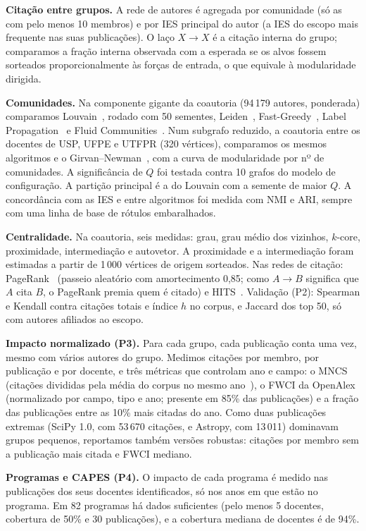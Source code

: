 \documentclass[12pt]{projeto}
\begin{document}
\textbf{Citação entre grupos.} A rede de autores é agregada por comunidade (só as com pelo menos 10 membros) e por IES principal do autor (a IES do escopo mais frequente nas suas publicações). O laço $X \to X$ é a citação interna do grupo; comparamos a fração interna observada com a esperada se os alvos fossem sorteados proporcionalmente às forças de entrada, o que equivale à modularidade dirigida.

\textbf{Comunidades.} Na componente gigante da coautoria (94\,179 autores, ponderada) comparamos Louvain~\cite{blondel2008}, rodado com 50 sementes, Leiden~\cite{traag2019}, Fast-Greedy~\cite{clauset2004}, Label Propagation~\cite{raghavan2007} e Fluid Communities~\cite{pares2017}. Num subgrafo reduzido, a coautoria entre os docentes de USP, UFPE e UTFPR (320 vértices), comparamos os mesmos algoritmos e o Girvan--Newman~\cite{girvan2002}, com a curva de modularidade por nº de comunidades. A significância de $Q$ foi testada contra 10 grafos do modelo de configuração. A partição principal é a do Louvain com a semente de maior $Q$. A concordância com as IES e entre algoritmos foi medida com NMI e ARI, sempre com uma linha de base de rótulos embaralhados.

\textbf{Centralidade.} Na coautoria, seis medidas: grau, grau médio dos vizinhos, $k$-core, proximidade, intermediação e autovetor. A proximidade e a intermediação foram estimadas a partir de 1\,000 vértices de origem sorteados. Nas redes de citação: PageRank~\cite{brin1998} (passeio aleatório com amortecimento 0,85; como $A \to B$ significa que $A$ cita $B$, o PageRank premia quem é citado) e HITS~\cite{kleinberg1999}. Validação (P2): Spearman e Kendall contra citações totais e índice $h$ no corpus, e Jaccard dos top 50, só com autores afiliados ao escopo.

\textbf{Impacto normalizado (P3).} Para cada grupo, cada publicação conta uma vez, mesmo com vários autores do grupo. Medimos citações por membro, por publicação e por docente, e três métricas que controlam ano e campo: o MNCS (citações divididas pela média do corpus no mesmo ano~\cite{waltman2011}), o FWCI da OpenAlex (normalizado por campo, tipo e ano; presente em 85\% das publicações) e a fração das publicações entre as 10\% mais citadas do ano. Como duas publicações extremas (SciPy 1.0, com 53\,670 citações, e Astropy, com 13\,011) dominavam grupos pequenos, reportamos também versões robustas: citações por membro sem a publicação mais citada e FWCI mediano.

\textbf{Programas e CAPES (P4).} O impacto de cada programa é medido nas publicações dos seus docentes identificados, só nos anos em que estão no programa. Em 82 programas há dados suficientes (pelo menos 5 docentes, cobertura de 50\% e 30 publicações), e a cobertura mediana de docentes é de 94\%.
\end{document}

